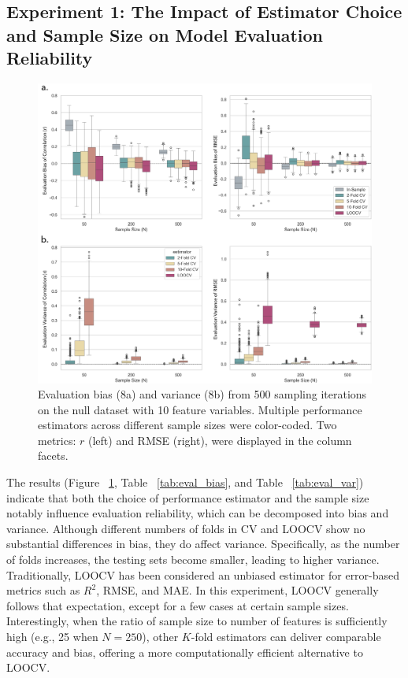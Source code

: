 \subsection{Experiment 1: The Impact of Estimator Choice and Sample Size on Model Evaluation Reliability}

\begin{figure}[H]
    \centering
    \includegraphics[width=.8\textwidth]{fig_6.jpg}
    \caption{Evaluation bias (8a) and variance (8b) from 500 sampling iterations on the null dataset with 10 feature variables. Multiple performance estimators across different sample sizes were color-coded. Two metrics: $r$ (left) and RMSE (right), were displayed in the column facets.}
    \label{fig:s1_biasvar}
\end{figure}


The results (Figure ~\ref{fig:s1_biasvar}, Table ~\ref{tab:eval_bias}, and Table ~\ref{tab:eval_var}) indicate that both the choice of performance estimator and the sample size notably influence evaluation reliability, which can be decomposed into bias and variance. Although different numbers of folds in CV and LOOCV show no substantial differences in bias, they do affect variance. Specifically, as the number of folds increases, the testing sets become smaller, leading to higher variance. Traditionally, LOOCV has been considered an unbiased estimator for error-based metrics such as $R^2$, RMSE, and MAE. In this experiment, LOOCV generally follows that expectation, except for a few cases at certain sample sizes. Interestingly, when the ratio of sample size to number of features is sufficiently high (e.g., 25 when $N=250$), other $K$-fold estimators can deliver comparable accuracy and bias, offering a more computationally efficient alternative to LOOCV.

